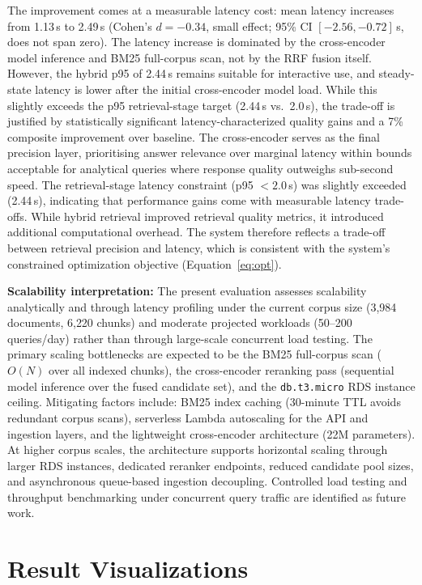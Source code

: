 \noindent The improvement comes at a measurable latency cost: mean latency increases from 1.13\,s to 2.49\,s (Cohen's $d = -0.34$, small effect; 95\% CI $[-2.56, -0.72]$\,s, does not span zero). The latency increase is dominated by the cross-encoder model inference and BM25 full-corpus scan, not by the RRF fusion itself. However, the hybrid p95 of 2.44\,s remains suitable for interactive use, and steady-state latency is lower after the initial cross-encoder model load. While this slightly exceeds the p95 retrieval-stage target (2.44\,s vs.\ 2.0\,s), the trade-off is justified by statistically significant latency-characterized quality gains and a 7\% composite improvement over baseline. The cross-encoder serves as the final precision layer, prioritising answer relevance over marginal latency within bounds acceptable for analytical queries where response quality outweighs sub-second speed. The retrieval-stage latency constraint (p95 $< 2.0$\,s) was slightly exceeded (2.44\,s), indicating that performance gains come with measurable latency trade-offs. While hybrid retrieval improved retrieval quality metrics, it introduced additional computational overhead. The system therefore reflects a trade-off between retrieval precision and latency, which is consistent with the system's constrained optimization objective (Equation~\ref{eq:opt}).

\textbf{Scalability interpretation:} The present evaluation assesses scalability analytically and through latency profiling under the current corpus size (3{,}984 documents, 6{,}220 chunks) and moderate projected workloads (50--200 queries/day) rather than through large-scale concurrent load testing. The primary scaling bottlenecks are expected to be the BM25 full-corpus scan ($O(N)$ over all indexed chunks), the cross-encoder reranking pass (sequential model inference over the fused candidate set), and the \texttt{db.t3.micro} RDS instance ceiling. Mitigating factors include: BM25 index caching (30-minute TTL avoids redundant corpus scans), serverless Lambda autoscaling for the API and ingestion layers, and the lightweight cross-encoder architecture (22M parameters). At higher corpus scales, the architecture supports horizontal scaling through larger RDS instances, dedicated reranker endpoints, reduced candidate pool sizes, and asynchronous queue-based ingestion decoupling. Controlled load testing and throughput benchmarking under concurrent query traffic are identified as future work.

\section{Result Visualizations}
\label{sec:visualizations}

